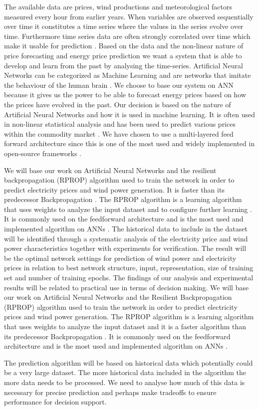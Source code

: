 The available data are prices, wind productions and meteorological factors measured every hour from earlier years. When variables are observed sequentially over time it constitutes a time series where the values in the series evolve over time. Furthermore time series data are often strongly correlated over time which make it usable for prediction \cite[Chapter~7.1.2]{econometrics}. Based on the data and the non-linear nature of price forecasting and energy price prediction we want a system that is able to develop and learn from the past by analysing the time-series. Artificial Neural Networks can be categorized as Machine Learning \cite{18} and are networks that imitate the behaviour of the human brain \cite{1}. We choose to base our system on ANN because it gives us the power to be able to forecast energy prices based on how the prices have evolved in the past. Our decision is based on the nature of Artificial Neural Networks and how it is used in machine learning. It is often used in non-linear statistical analysis \cite{16} and has been used to predict various prices within the commodity market \cite{2,3,stockForecasting,pjmForecast}. We have chosen to use a multi-layered feed forward architecture since this is one of the most used and widely implemented in open-source frameworks \cite{17}.

We will base our work on Artificial Neural Networks and the resilient backpropagation (RPROP) algorithm used to train the network in order to predict electricity prices and wind power generation. It is faster than its predecessor Backpropagation \cite{8,15}.  The RPROP algorithm is a learning algorithm that uses weights to analyze the input dataset and to configure further learning \cite{17}. It is commonly used on the feedforward architecture and is the most used and implemented algorithm on ANNs \cite{14,17}. The historical data to include in the dataset will be identified through a systematic analysis of the electricity price and wind power characteristics together with experiments for verification. The result will be the optimal network settings for prediction of wind power and electricity prices in relation to best network structure, input, representation, size of training set and number of training epochs. The findings of our analysis and experimental results will be related to practical use in terms of decision making. We will base our work on Artificial Neural Networks and the Resilient Backpropagation (RPROP) algorithm used to train the network in order to predict electricity prices and wind power generation. The RPROP algorithm is a learning algorithm that uses weights to analyze the input dataset\cite{17} and it is a faster algorithm than its predecessor Backpropagation \cite{8,15}. It is commonly used on the feedforward architecture and is the most used and implemented algorithm on ANNs \cite{14,17}.

The prediction algorithm will be based on historical data which potentially could be a very large dataset. The more historical data included in the algorithm the more data needs to be processed. We need to analyse how much of this data is necessary for precise prediction and perhaps make tradeoffs to ensure performance for decision support.